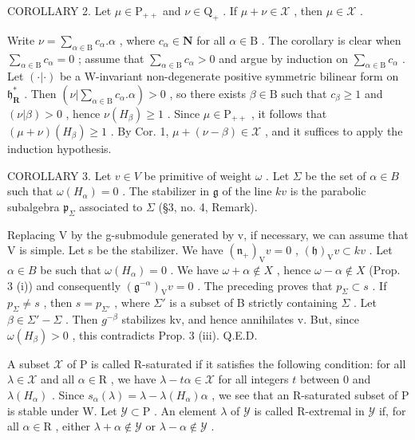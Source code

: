 COROLLARY 2. Let \(\mu \in \mathrm{P}_{++}\) and \(\nu \in \mathrm{Q}_{+}\) . If \(\mu + \nu \in \mathcal{X}\) , then \(\mu \in \mathcal{X}\) .

Write \(\nu = \sum_{\alpha \in \mathrm{B}} c_{\alpha}.\alpha\) , where \(c_{\alpha} \in \mathbf{N}\) for all \(\alpha \in \mathrm{B}\) . The corollary is clear when \(\sum_{\alpha \in \mathrm{B}} c_{\alpha} = 0\) ; assume that \(\sum_{\alpha \in \mathrm{B}} c_{\alpha} > 0\) and argue by induction on \(\sum_{\alpha \in \mathrm{B}} c_{\alpha}\) . Let \((\cdot|\cdot)\) be a W-invariant non-degenerate positive symmetric bilinear form on \(\mathfrak{h}_{\mathbf{R}}^{*}\) . Then \((\nu|\sum_{\alpha \in \mathrm{B}} c_{\alpha}.\alpha) > 0\) , so there exists \(\beta \in \mathrm{B}\) such that \(c_{\beta} \geq 1\) and \((\nu|\beta) > 0\) , hence \(\nu(H_{\beta}) \geq 1\) . Since \(\mu \in \mathrm{P}_{++}\) , it follows that \((\mu + \nu)(H_{\beta}) \geq 1\) . By Cor. 1, \(\mu + (\nu - \beta) \in \mathcal{X}\) , and it suffices to apply the induction hypothesis.

COROLLARY 3. Let \(v \in V\) be primitive of weight \(\omega\) . Let \(\Sigma\) be the set of \(\alpha \in B\) such that \(\omega(H_{\alpha}) = 0\) . The stabilizer in \(\mathfrak{g}\) of the line \(kv\) is the parabolic subalgebra \(\mathfrak{p}_{\Sigma}\) associated to \(\Sigma\) (§3, no. 4, Remark).

Replacing V by the g-submodule generated by v, if necessary, we can assume that V is simple. Let s be the stabilizer. We have \((\mathfrak{n}_{+})_{\mathrm{V}}v = 0\) , \((\mathfrak{h})_{\mathrm{V}}v \subset kv\) . Let \(\alpha \in B\) be such that \(\omega(H_{\alpha}) = 0\) . We have \(\omega + \alpha \notin X\) , hence \(\omega - \alpha \notin X\) (Prop. 3 (i)) and consequently \((\mathfrak{g}^{-\alpha})_{\mathrm{V}}v = 0\) . The preceding proves that \(p_{\Sigma} \subset s\) . If \(p_{\Sigma} \neq s\) , then \(s = p_{\Sigma'}\) , where \(\Sigma'\) is a subset of B strictly containing \(\Sigma\) . Let \(\beta \in \Sigma' - \Sigma\) . Then \(g^{-\beta}\) stabilizes kv, and hence annihilates v. But, since \(\omega(H_{\beta}) > 0\) , this contradicts Prop. 3 (iii). Q.E.D.

A subset \(\mathcal{X}\) of P is called R-saturated if it satisfies the following condition: for all \(\lambda \in \mathcal{X}\) and all \(\alpha \in \mathrm{R}\) , we have \(\lambda - t\alpha \in \mathcal{X}\) for all integers \(t\) between 0 and \(\lambda(H_{\alpha})\) . Since \(s_{\alpha}(\lambda) = \lambda - \lambda(H_{\alpha})\alpha\) , we see that an R-saturated subset of P is stable under W. Let \(\mathcal{Y} \subset \mathrm{P}\) . An element \(\lambda\) of \(\mathcal{Y}\) is called R-extremal in \(\mathcal{Y}\) if, for all \(\alpha \in \mathrm{R}\) , either \(\lambda + \alpha \notin \mathcal{Y}\) or \(\lambda - \alpha \notin \mathcal{Y}\) .

